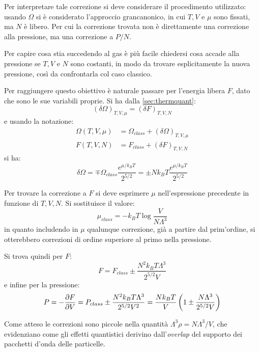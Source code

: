 Per interpretare tale correzione si deve considerare il procedimento utilizzato: usando $\Omega$ si è considerato l'approccio grancanonico, in cui $T,V$ e $\mu$ sono fissati, ma $N$ è libero. Per cui la correzione trovata non è direttamente una correzione alla pressione, ma una correzione a $P/N$.

\noindent Per capire cosa stia succedendo al gas è più facile chiedersi cosa accade alla pressione se $T,V$ e $N$ sono costanti, in modo da trovare esplicitamente la nuova pressione, così da confrontarla col caso classico.

Per raggiungere questo obiettivo è naturale passare per l'energia libera $F$, dato che sono le sue variabili proprie.
Si ha dalla \cref{sec:thermquant}:
\begin{equation*}
(\delta \Omega)_{T, V, \mu} = (\delta F)_{T,V,N}
\end{equation*}
e usando la notazione:
\begin{align*}
\Omega(T,V,\mu) &= \Omega_{class} + (\delta \Omega)_{T, V, \mu}\\
F(T,V,N) &= F_{class} + (\delta F)_{T, V, N}
\end{align*}
si ha:
\begin{equation*}
\delta \Omega = \mp \Omega_{class}\frac{e^{\mu/k_B T}}{2^{5/2}} = \pm N k_B T \frac{e^{\mu/k_B T}}{2^{5/2}}
\end{equation*}

Per trovare la correzione a $F$ si deve esprimere $\mu$ nell'espressione precedente in funzione di $T,V,N$. Si sostituisce il valore:
\begin{equation*}
\mu_{class} = -k_B T \log\frac{V}{N \Lambda^3}
\end{equation*}
in quanto includendo in $\mu$ qualunque correzione, già a partire dal prim'ordine, si otterebbero correzioni di ordine superiore al primo nella pressione.

Si trova quindi per $F$:
\begin{equation*}
F = F_{class} \pm \frac{N^2 k_B T \Lambda^3}{2^{5/2} V}
\end{equation*}
e infine per la pressione:
\begin{equation*}
P = - \frac{\partial {F}}{\partial {V}} = P_{class} \pm \frac{N^2 k_B T \Lambda^3}{2^{5/2} V^2} = \frac{N k_B T}{V} \left(1  \pm \frac{N\Lambda^3}{2^{5/2} V}\right)
\end{equation*}

Come atteso le correzioni sono piccole nella quantità $\Lambda^3 \rho = N\Lambda^3 / V$, che evidenziano come gli effetti quantistici derivino dall'\textit{overlap} del supporto dei pacchetti d'onda delle particelle.

